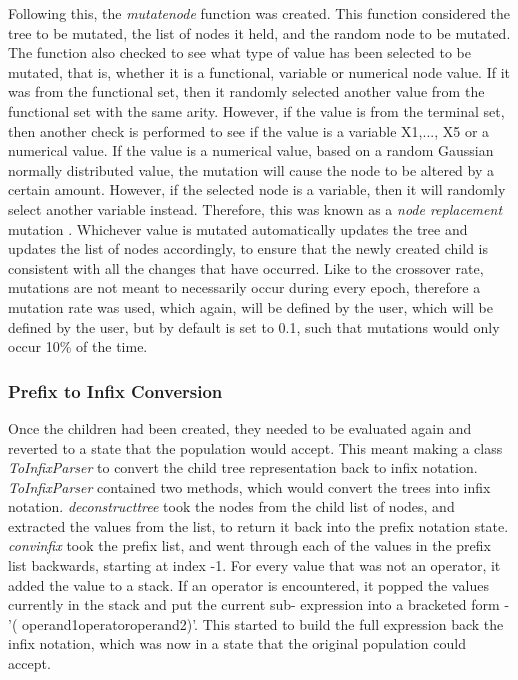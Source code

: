 \documentclass[11pt]{article}
\begin{document}
Following this, the \textit{mutate\textunderscore node} function was created. This function considered the tree to be mutated, the list of nodes it held, and the random node to be mutated. The function also checked to see what type of value has been selected to be mutated, that is, whether it is a functional, variable or numerical node value. If it was from the functional set, then it randomly selected another value from the functional set with the same arity. However, if the value is from the terminal set, then another check is performed to see if the value is a variable X1,..., X5 or a numerical value. If the value is a numerical value, based on a random Gaussian normally distributed value, the mutation will cause the node to be altered by a certain amount. However, if the selected node is a variable, then it will randomly select another variable instead. Therefore, this was known as a \textit{node replacement} mutation \cite{ref-book}. Whichever value is mutated automatically updates the tree and updates the list of nodes accordingly, to ensure that the newly created child is consistent with all the changes that have occurred. Like to the crossover rate, mutations are not meant to necessarily occur during every epoch, therefore a mutation rate was used, which again, will be defined by the user, which will be defined by the user, but by default is set to 0.1, such that mutations would only occur 10\% of the time.
\subsubsection{Prefix to Infix Conversion}\label{subsubsec:P2I}
Once the children had been created, they needed to be evaluated again and reverted to a state that the population would accept. This meant making a class \textit{ToInfixParser} to convert the child tree representation back to infix notation. 
\textit{ToInfixParser} contained two methods, which would convert the trees into infix notation. \textit{deconstruct\textunderscore tree} took the nodes from the child list of nodes, and extracted the values from the list, to return it back into the prefix notation state. 
\textit{conv\textunderscore infix} took the prefix list, and went through each of the values in the prefix list backwards, starting at index -1. For every value that was not an operator, it added the value to a stack. If an operator is encountered, it popped the values currently in the stack and put the current sub- expression into a bracketed form - '( \textlangle{}operand1\textrangle{}\textlangle{}operator\textrangle{}\textlangle{}operand2\textrangle{})'. This started to build the full expression back the infix notation, which was now in a state that the original population could accept.
\end{document}
